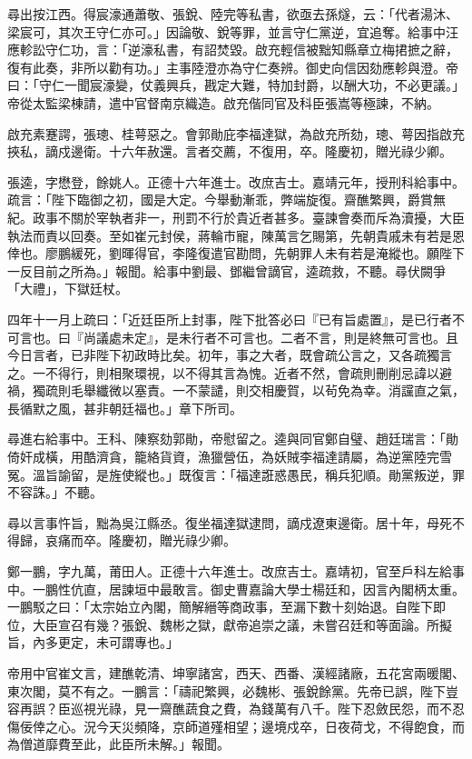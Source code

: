 \begin{pinyinscope}
尋出按江西。得宸濠通蕭敬、張銳、陸完等私書，欲亟去孫燧，云：「代者湯沐、梁宸可，其次王守仁亦可。」因論敬、銳等罪，並言守仁黨逆，宜追奪。給事中汪應軫訟守仁功，言：「逆濠私書，有詔焚毀。啟充輕信被黜知縣章立梅捃摭之辭，復有此奏，非所以勸有功。」主事陸澄亦為守仁奏辨。御史向信因劾應軫與澄。帝曰：「守仁一聞宸濠變，仗義興兵，戡定大難，特加封爵，以酬大功，不必更議。」帝從太監梁棟請，遣中官督南京織造。啟充偕同官及科臣張嵩等極諫，不納。

啟充素蹇諤，張璁、桂萼惡之。會郭勛庇李福達獄，為啟充所劾，璁、萼因指啟充挾私，謫戍邊衛。十六年赦還。言者交薦，不復用，卒。隆慶初，贈光祿少卿。

張逵，字懋登，餘姚人。正德十六年進士。改庶吉士。嘉靖元年，授刑科給事中。疏言：「陛下臨御之初，國是大定。今舉動漸乖，弊端旋復。齋醮繁興，爵賞無紀。政事不關於宰執者非一，刑罰不行於貴近者甚多。臺諫會奏而斥為瀆擾，大臣執法而責以回奏。至如崔元封侯，蔣輪市寵，陳萬言乞賜第，先朝貴戚未有若是恩倖也。廖鵬緩死，劉暉得官，李隆復遣官勘問，先朝罪人未有若是淹縱也。願陛下一反目前之所為。」報聞。給事中劉最、鄧繼曾謫官，逵疏救，不聽。尋伏闕爭「大禮」，下獄廷杖。

四年十一月上疏曰：「近廷臣所上封事，陛下批答必曰『已有旨處置』，是已行者不可言也。曰『尚議處未定』，是未行者不可言也。二者不言，則是終無可言也。且今日言者，已非陛下初政時比矣。初年，事之大者，既會疏公言之，又各疏獨言之。一不得行，則相聚環視，以不得其言為愧。近者不然，會疏則刪削忌諱以避禍，獨疏則毛舉纖微以塞責。一不蒙譴，則交相慶賀，以茍免為幸。消讜直之氣，長循默之風，甚非朝廷福也。」章下所司。

尋進右給事中。王科、陳察劾郭勛，帝慰留之。逵與同官鄭自璧、趙廷瑞言：「勛倚奸成橫，用酷濟貪，籠絡貨資，漁獵營伍，為妖賊李福達請屬，為逆黨陸完雪冤。溫旨諭留，是旌使縱也。」既復言：「福達誑惑愚民，稱兵犯順。勛黨叛逆，罪不容誅。」不聽。

尋以言事忤旨，黜為吳江縣丞。復坐福達獄逮問，謫戍遼東邊衛。居十年，母死不得歸，哀痛而卒。隆慶初，贈光祿少卿。

鄭一鵬，字九萬，莆田人。正德十六年進士。改庶吉士。嘉靖初，官至戶科左給事中。一鵬性伉直，居諫垣中最敢言。御史曹嘉論大學士楊廷和，因言內閣柄太重。一鵬駁之曰：「太宗始立內閣，簡解縉等商政事，至漏下數十刻始退。自陛下即位，大臣宣召有幾？張銳、魏彬之獄，獻帝追崇之議，未嘗召廷和等面論。所擬旨，內多更定，未可謂專也。」

帝用中官崔文言，建醮乾清、坤寧諸宮，西天、西番、漢經諸廠，五花宮兩暖閣、東次閣，莫不有之。一鵬言：「禱祀繁興，必魏彬、張銳餘黨。先帝已誤，陛下豈容再誤？臣巡視光祿，見一齋醮蔬食之費，為錢萬有八千。陛下忍斂民怨，而不忍傷佞倖之心。況今天災頻降，京師道殣相望；邊境戍卒，日夜荷戈，不得飽食，而為僧道靡費至此，此臣所未解。」報聞。


\end{pinyinscope}
